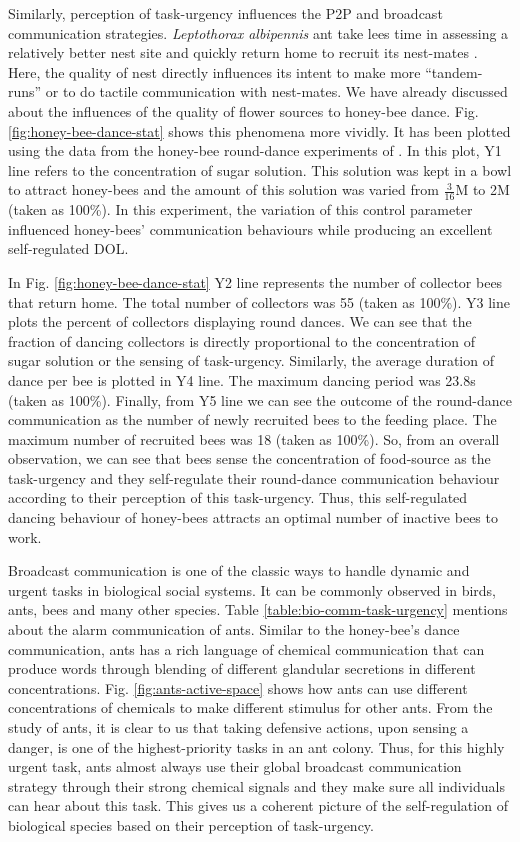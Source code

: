 \documentclass{intech}
\begin{document}
Similarly, perception of task-urgency influences the P2P and broadcast communication strategies. {\em Leptothorax albipennis} ant take lees time in assessing a relatively better nest site and quickly return home to recruit its nest-mates \citep{Pratt+2002}. Here, the quality of nest directly influences its intent to make more ``tandem-runs'' or to do tactile communication with nest-mates. We have already discussed about the influences of the quality of  flower sources to honey-bee dance.  Fig. \ref{fig:honey-bee-dance-stat} shows this phenomena more vividly. It has been plotted using the data from the honey-bee round-dance experiments of \cite[p. 45]{Von1967}. In this plot, Y1 line refers to the concentration of sugar solution. This solution was kept in a bowl  to attract honey-bees and the amount of this solution was varied from $\frac{3}{16}$M to 2M (taken as 100\%). In this experiment, the variation of this control parameter influenced honey-bees' communication behaviours while producing an excellent self-regulated DOL.

In Fig. \ref{fig:honey-bee-dance-stat} Y2 line represents the number of collector bees that return home. The total number of collectors was 55 (taken as 100\%). Y3 line plots the percent of collectors displaying round dances. We can see that the fraction of dancing collectors is directly proportional to the concentration of sugar solution or the sensing of task-urgency. Similarly, the average duration of dance per bee  is plotted in Y4 line. The maximum dancing period was 23.8s (taken as 100\%). Finally, from Y5 line we can see the outcome of the round-dance communication as the number of newly recruited bees to the feeding place. The maximum number of recruited bees was 18 (taken as 100\%). So, from an overall observation, we can see that bees sense the concentration of food-source  as the task-urgency and they self-regulate their round-dance communication behaviour according to their perception of this task-urgency. Thus, this self-regulated dancing behaviour of honey-bees attracts an optimal number of inactive bees to work.

Broadcast communication is one of the classic ways to handle dynamic and urgent tasks in biological social systems. It can be commonly observed in birds, ants, bees and many other species. Table \ref{table:bio-comm-task-urgency} mentions about the alarm communication of ants. Similar to the honey-bee's dance communication, ants has a rich language of chemical communication that can produce words through blending of different glandular secretions in different concentrations. Fig. \ref{fig:ants-active-space} shows how ants can use different concentrations of chemicals to make different stimulus for other ants. From the study of ants, it is clear to us that taking defensive actions, upon sensing a danger, is one of the highest-priority tasks in an ant colony. Thus, for this highly urgent task, ants almost always use their global broadcast communication strategy through their strong chemical signals and they make sure all individuals can hear about this task.  This gives us a coherent picture of the self-regulation of biological species based on their perception of task-urgency.
\end{document}
